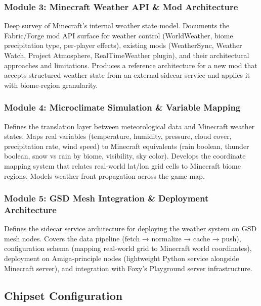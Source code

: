 \documentclass[11pt,letterpaper]{article}
\begin{document}
\subsubsection{Module 3: Minecraft Weather API \& Mod Architecture}
Deep survey of Minecraft's internal weather state model. Documents the Fabric/Forge mod API surface for weather control (WorldWeather, biome precipitation type, per-player effects), existing mods (WeatherSync, Weather Watch, Project Atmosphere, RealTimeWeather plugin), and their architectural approaches and limitations. Produces a reference architecture for a new mod that accepts structured weather state from an external sidecar service and applies it with biome-region granularity.

\subsubsection{Module 4: Microclimate Simulation \& Variable Mapping}
Defines the translation layer between meteorological data and Minecraft weather states. Maps real variables (temperature, humidity, pressure, cloud cover, precipitation rate, wind speed) to Minecraft equivalents (rain boolean, thunder boolean, snow vs rain by biome, visibility, sky color). Develops the coordinate mapping system that relates real-world lat/lon grid cells to Minecraft biome regions. Models weather front propagation across the game map.

\subsubsection{Module 5: GSD Mesh Integration \& Deployment Architecture}
Defines the sidecar service architecture for deploying the weather system on GSD mesh nodes. Covers the data pipeline (fetch → normalize → cache → push), configuration schema (mapping real-world grid to Minecraft world coordinates), deployment on Amiga-principle nodes (lightweight Python service alongside Minecraft server), and integration with Foxy's Playground server infrastructure.

\subsection{Chipset Configuration}
\end{document}

